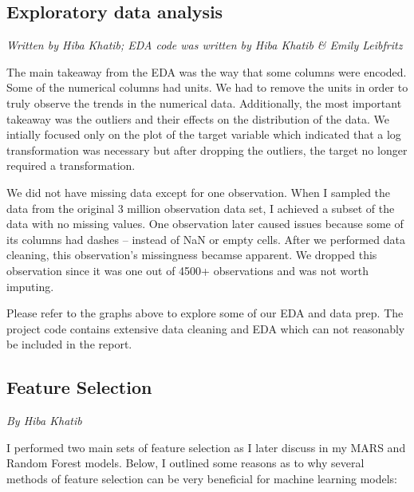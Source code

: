 \documentclass[
  letterpaper,
  DIV=11,
  numbers=noendperiod]{scrartcl}
\begin{document}
\hypertarget{exploratory-data-analysis}{%
\subsection{Exploratory data analysis}\label{exploratory-data-analysis}}

\emph{Written by Hiba Khatib; EDA code was written by Hiba Khatib \&
Emily Leibfritz}

The main takeaway from the EDA was the way that some columns were
encoded. Some of the numerical columns had units. We had to remove the
units in order to truly observe the trends in the numerical data.
Additionally, the most important takeaway was the outliers and their
effects on the distribution of the data. We intially focused only on the
plot of the target variable which indicated that a log transformation
was necessary but after dropping the outliers, the target no longer
required a transformation.

We did not have missing data except for one observation. When I sampled
the data from the original 3 million observation data set, I achieved a
subset of the data with no missing values. One observation later caused
issues because some of its columns had dashes -- instead of NaN or empty
cells. After we performed data cleaning, this observation's missingness
becamse apparent. We dropped this observation since it was one out of
4500+ observations and was not worth imputing.

Please refer to the graphs above to explore some of our EDA and data
prep. The project code contains extensive data cleaning and EDA which
can not reasonably be included in the report.

\hypertarget{feature-selection}{%
\subsection{Feature Selection}\label{feature-selection}}

\emph{By Hiba Khatib}

I performed two main sets of feature selection as I later discuss in my
MARS and Random Forest models. Below, I outlined some reasons as to why
several methods of feature selection can be very beneficial for machine
learning models:
\end{document}
